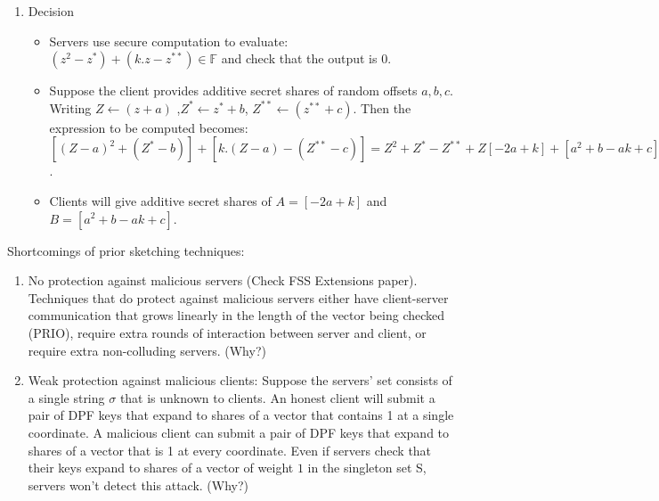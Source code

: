 \begin{enumerate}
    \item Decision
    \begin{itemize}
        \item Servers use secure computation to evaluate: $(z^2 - z^*) + (k.z - z^{**}) \in \mathbb{F}$ and check that the output is $0$. 
        \item Suppose the client provides additive secret shares of random offsets $a, b, c$. Writing $Z \leftarrow (z+a)$ ,$Z^* \leftarrow z^* + b$, $Z^{**} \leftarrow (z^{**} + c)$. Then the expression to be computed becomes: $[(Z-a)^2 + (Z^* - b)] + [k.(Z-a) - (Z^{**} - c)] = Z^2 + Z^* - Z^{**} + Z[-2a+k] + [a^2 + b - ak + c]$.
        \item Clients will give additive secret shares of $A = [-2a + k]$ and $B = [a^2 + b - ak + c]$. 
    \end{itemize}
\end{enumerate}

Shortcomings of prior sketching techniques:
\begin{enumerate}
    \item No protection against malicious servers (Check FSS Extensions paper). Techniques that do protect against malicious servers either have client-server communication that grows linearly in the length of the vector being checked (PRIO), require extra rounds of interaction between server and client, or require extra non-colluding servers. (Why?)
    \item Weak protection against malicious clients: Suppose the servers' set consists of a single string $\sigma$ that is unknown to clients. An honest client will submit a pair of DPF keys that expand to shares of a vector that contains 1 at a single coordinate. A malicious client can submit a pair of DPF keys that expand to shares of a vector that is 1 at every coordinate. Even if servers check that their keys expand to shares of a vector of weight $1$ in the singleton set S, servers won't detect this attack. (Why?)
\end{enumerate}

